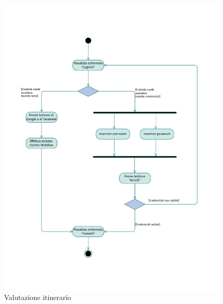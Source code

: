 \documentclass{natourDoc}
\begin{document}
\newpage
\begin{figure}[!htbp]
	\centering
	\includegraphics[width=\textwidth, page=10]{./diagrams/activity.pdf}
	\caption{Valutazione itinerario}
\end{figure}
\FloatBarrier
\end{document}
